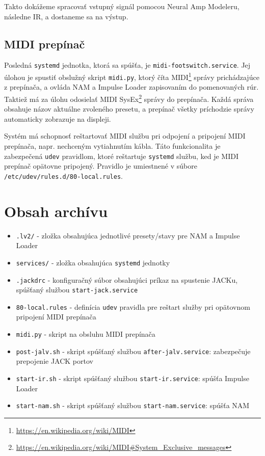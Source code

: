 \documentclass{article}
\begin{document}
Takto dokážeme spracovať vstupný signál pomocou Neural Amp Modeleru, následne IR, a dostaneme sa na výstup.

\subsection{MIDI prepínač}
Posledná \texttt{systemd} jednotka, ktorá sa spúšťa, je \texttt{midi-footswitch.service}. Jej úlohou je spustiť obslužný skript \texttt{midi.py}, ktorý číta MIDI\footnote{\url{https://en.wikipedia.org/wiki/MIDI}} správy prichádzajúce z prepínača, a ovláda NAM a Impulse Loader zapisovaním do pomenovaných rúr. Taktiež má za úlohu odosielať MIDI SysEx\footnote{\url{https://en.wikipedia.org/wiki/MIDI\#System\_Exclusive\_messages}} správy do prepínača. Každá správa obsahuje názov aktuálne zvoleného presetu, a prepínač všetky príchodzie správy automaticky zobrazuje na displeji. 


Systém má schopnosť reštartovať MIDI službu pri odpojení a pripojení MIDI prepínača, napr. nechceným vytiahnutím kábla. Táto funkcionalita je zabezpečená \texttt{udev} pravidlom, ktoré reštartuje \texttt{systemd} službu, ked je MIDI prepínač opätovne pripojený. Pravidlo je umiestnené v súbore \texttt{/etc/udev/rules.d/80-local.rules}.

\section{Obsah archívu}
\begin{itemize}
    \item \texttt{.lv2/} - zložka obsahujúca jednotlivé presety/stavy pre NAM a Impulse Loader
    \item \texttt{services/} - zložka obsahujúca \texttt{systemd} jednotky
    \item \texttt{.jackdrc} - konfiguračný súbor obsahujúci príkaz na spustenie JACKu, spúšťaný službou \texttt{start-jack.service}
    \item \texttt{80-local.rules} - definícia \texttt{udev} pravidla pre reštart služby pri opätovnom pripojení MIDI prepínača
    \item \texttt{midi.py} - skript na obsluhu MIDI prepínača
    \item \texttt{post-jalv.sh} - skript spúšťaný službou \texttt{after-jalv.service}: zabezpečuje prepojenie JACK portov
    \item \texttt{start-ir.sh} - skript spúšťaný službou \texttt{start-ir.service}: spúšťa Impulse Loader
    \item \texttt{start-nam.sh} - skript spúšťaný službou \texttt{start-nam.service}: spúšťa NAM
\end{itemize}
\end{document}
